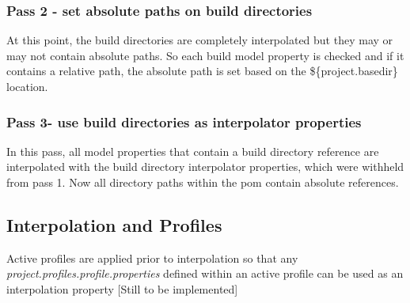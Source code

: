 \documentclass[12pt]{amsart}
\begin{document}
\subsubsection{Pass 2 - set absolute paths on build directories} At this point, the build directories are completely interpolated but they may or may not contain absolute paths. So each build model property is checked and if it contains a relative path, the absolute path is set based on the \$\{project.basedir\} location.

\subsubsection{Pass 3- use build directories as interpolator properties} In this pass, all model properties that contain a build directory reference are interpolated with the build directory interpolator properties, which were withheld from pass 1. Now all directory paths within the pom contain absolute references.

\subsection{Interpolation and Profiles}
Active profiles are applied prior to interpolation so that any \emph{project.profiles.profile.properties} defined within an active profile can be used as an interpolation property [Still to be implemented]
\end{document}

